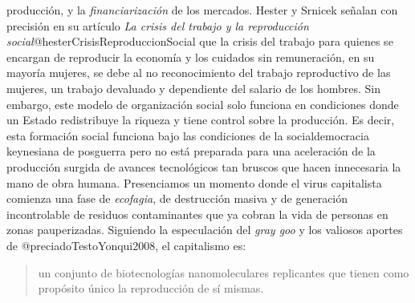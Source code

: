 \documentclass[
]{article}
\begin{document}
producción, y la \emph{financiarización} de los mercados. Hester y
Srnicek señalan con precisión en su artículo \emph{La crisis del trabajo
y la reproducción social}@hesterCrisisReproduccionSocial que la crisis
del trabajo para quienes se encargan de reproducir la economía y los
cuidados sin remuneración, en su mayoría mujeres, se debe al no
reconocimiento del trabajo reproductivo de las mujeres, un trabajo
devaluado y dependiente del salario de los hombres. Sin embargo, este
modelo de organización social solo funciona en condiciones donde un
Estado redistribuye la riqueza y tiene control sobre la producción. Es
decir, esta formación social funciona bajo las condiciones de la
socialdemocracia keynesiana de posguerra pero no está preparada para una
aceleración de la producción surgida de avances tecnológicos tan bruscos
que hacen innecesaria la mano de obra humana. Presenciamos un momento
donde el virus capitalista comienza una fase de \emph{ecofagia}, de
destrucción masiva y de generación incontrolable de residuos
contaminantes que ya cobran la vida de personas en zonas pauperizadas.
Siguiendo la especulación del \emph{gray goo} y los valiosos aportes de
@preciadoTestoYonqui2008, el capitalismo es:

\begin{quote}
un conjunto de biotecnologías nanomoleculares replicantes que tienen
como propósito único la reproducción de sí mismas.
\end{quote}
\end{document}
